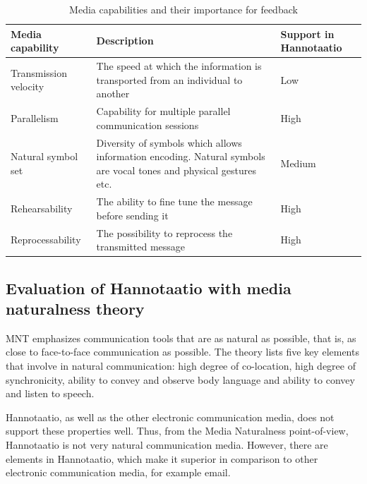 \documentclass[english,12pt,a4paper,pdftex]{article}
\begin{document}
\begin{table}[!h]
\renewcommand{\arraystretch}{1.3}
\caption{Media capabilities and their importance for feedback}
\label{table:capabilities}
\centering
\begin{tabular}{|p{4cm}|p{7cm}|p{3cm}|}
\hline
\textbf{Media \newline capability} & \textbf{Description} & \textbf{Support in Hannotaatio}\\
\hline
Transmission \newline velocity & The speed at which the information is transported from an individual to another & Low\\
\hline
Parallelism & Capability for multiple parallel communication sessions & High\\
\hline
Natural symbol set & Diversity of symbols which allows information encoding. Natural symbols are vocal tones and physical gestures etc. & Medium\\
\hline
Rehearsability & The ability to fine tune the message before sending it & High\\
\hline
Reprocessability & The possibility to reprocess the transmitted message & High\\
\hline
\end{tabular}
\end{table}

\subsection{Evaluation of Hannotaatio with media naturalness theory}

\Ac{MNT} emphasizes communication tools that are as natural as possible, that is, as close to face-to-face communication as possible. The theory lists five key elements that involve in natural communication: high degree of co-location, high degree of synchronicity, ability to convey and observe body language and ability to convey and listen to speech.

Hannotaatio, as well as the other electronic communication media, does not support these properties well. Thus, from the Media Naturalness point-of-view, Hannotaatio is not very natural communication media. However, there are elements in Hannotaatio, which make it superior in comparison to other electronic communication media, for example email.
\end{document}
